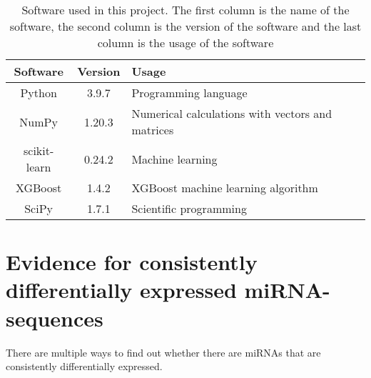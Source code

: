 \begin{table}
    \caption{Software used in this project. The first column is the name of the software, the second column is the version of the software and the last column is the usage of the software}
    \label{tab:software}
    \centering
    \begin{tabular}{|c|c|l|}
       \hline
       \bfseries Software & \bfseries Version & \bfseries Usage \\
       \hline 
       Python\tablefootnote{\url{https://www.python.org}} & 3.9.7 & Programming language \\
       \hline
       NumPy\tablefootnote{\url{https://numpy.org}} & 1.20.3 & Numerical calculations with vectors and matrices \\
       \hline
       scikit-learn\tablefootnote{\url{https://scikit-learn.org/}} & 0.24.2 & Machine learning \\
       \hline
       XGBoost\tablefootnote{\url{https://xgboost.readthedocs.io/}} & 1.4.2 & XGBoost machine learning algorithm \\
       \hline
       SciPy\tablefootnote{\url{https://scipy.org}} & 1.7.1 & Scientific programming \\
       \hline
    \end{tabular}
\end{table}

\section{Evidence for consistently differentially expressed miRNA-sequences}

There are multiple ways to find out whether there are miRNAs that are consistently differentially expressed.

